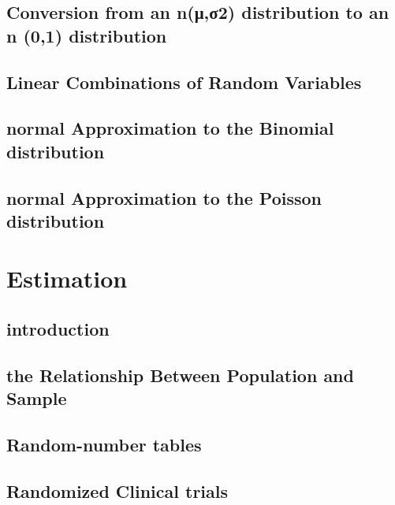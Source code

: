 \documentclass[12pt,]{article}
\theoremstyle{definition}
\theoremstyle{definition}
\theoremstyle{definition}
\theoremstyle{remark}
\begin{document}
\subsection{Conversion from an n(μ,σ2) distribution to an n (0,1)
distribution}\label{conversion-from-an-n2-distribution-to-an-n-01-distribution}

\subsection{Linear Combinations of Random
Variables}\label{linear-combinations-of-random-variables}

\subsection{normal Approximation to the Binomial
distribution}\label{normal-approximation-to-the-binomial-distribution}

\subsection{normal Approximation to the Poisson
distribution}\label{normal-approximation-to-the-poisson-distribution}

\section{Estimation}\label{estimation}

\subsection{introduction}\label{introduction-4}

\subsection{the Relationship Between Population and
Sample}\label{the-relationship-between-population-and-sample}

\subsection{Random-number tables}\label{random-number-tables}

\subsection{Randomized Clinical
trials}\label{randomized-clinical-trials}
\end{document}
